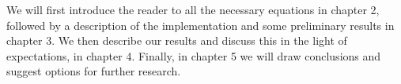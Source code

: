 We will first introduce the reader to all the necessary equations in chapter 2, followed by a description of the implementation and some preliminary results in chapter 3. We then describe our results and discuss this in the light of expectations, in chapter 4. Finally, in chapter 5 we will draw conclusions and suggest options for further research.